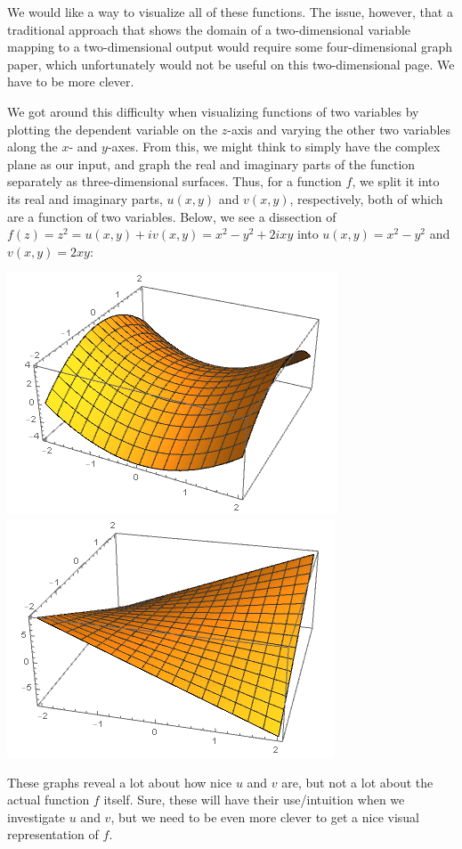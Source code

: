 We would like a way to visualize all of these functions. The issue, however, that a traditional approach that shows the domain of a two-dimensional variable mapping to a two-dimensional output would require some four-dimensional graph paper, which unfortunately would not be useful on this two-dimensional page. We have to be more clever.

We got around this difficulty when visualizing functions of two variables by plotting the dependent variable on the $z$-axis and varying the other two variables along the $x$- and $y$-axes. From this, we might think to simply have the complex plane as our input, and graph the real and imaginary parts of the function separately as three-dimensional surfaces. Thus, for a function $f$, we split it into its real and imaginary parts, $u(x,y)$ and $v(x,y)$, respectively, both of which are a function of two variables. Below, we see a dissection of $f(z) = z^2 = u(x,y) + i v(x,y) = x^2-y^2 + 2ixy$ into $u(x,y) = x^2 - y^2$ and $v(x,y) = 2xy$:
\begin{center}
    \includegraphics[scale=0.5]{images/rezsqr.png}
    \includegraphics[scale=0.5]{images/imzsqr.png}
\end{center}
These graphs reveal a lot about how nice $u$ and $v$ are, but not a lot about the actual function $f$ itself. Sure, these will have their use/intuition when we investigate $u$ and $v$, but we need to be even more clever to get a nice visual representation of $f$.


